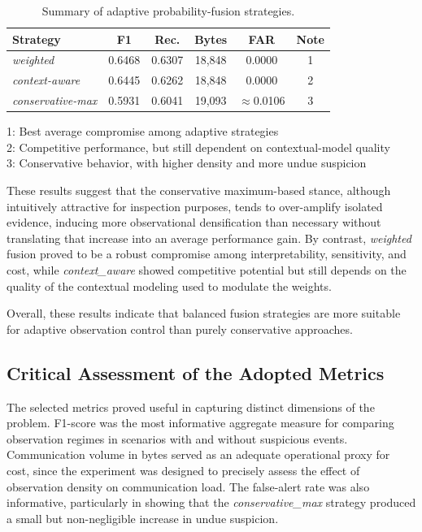 \documentclass[journal]{IEEEtran}
\begin{document}
\begin{table}[ht]
\centering
\caption{Summary of adaptive probability-fusion strategies.}
\label{tab:agg_fusion_results}
\scriptsize
\begin{tabular}{lcccc c}
\hline
\textbf{Strategy} & \textbf{F1} & \textbf{Rec.} & \textbf{Bytes} & \textbf{FAR} & \textbf{Note} \\
\hline
\textit{weighted} 
& 0.6468 & 0.6307 & 18,848 & 0.0000 & 1 \\

\textit{context-aware} 
& 0.6445 & 0.6262 & 18,848 & 0.0000 & 2 \\

\textit{conservative-max} 
& 0.5931 & 0.6041 & 19,093 & $\approx$0.0106 & 3 \\
\hline
\end{tabular}

\vspace{0.5mm}
\begin{minipage}{\columnwidth}
\footnotesize
1: Best average compromise among adaptive strategies\\
2: Competitive performance, but still dependent on contextual-model quality\\
3: Conservative behavior, with higher density and more undue suspicion
\end{minipage}
\end{table}


These results suggest that the conservative maximum-based stance, although intuitively attractive for inspection purposes, tends to over-amplify isolated evidence, inducing more observational densification than necessary without translating that increase into an average performance gain. By contrast, \textit{weighted} fusion proved to be a robust compromise among interpretability, sensitivity, and cost, while \textit{context\_aware} showed competitive potential but still depends on the quality of the contextual modeling used to modulate the weights.

Overall, these results indicate that balanced fusion strategies are more suitable for adaptive observation control than purely conservative approaches.


\subsection{Critical Assessment of the Adopted Metrics}
The selected metrics proved useful in capturing distinct dimensions of the problem. F1-score was the most informative aggregate measure for comparing observation regimes in scenarios with and without suspicious events. Communication volume in bytes served as an adequate operational proxy for cost, since the experiment was designed to precisely assess the effect of observation density on communication load. The false-alert rate was also informative, particularly in showing that the \textit{conservative\_max} strategy produced a small but non-negligible increase in undue suspicion.
\end{document}
